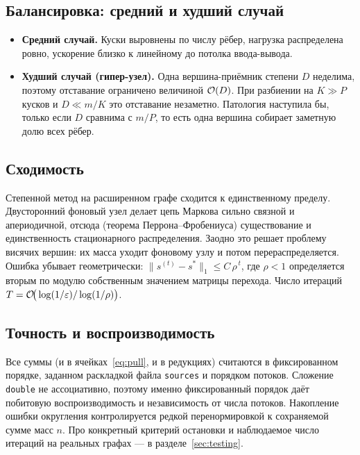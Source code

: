 \subsection{Балансировка: средний и худший случай}
\begin{itemize}[itemsep=2pt]
  \item \textbf{Средний случай.} Куски выровнены по числу рёбер, нагрузка распределена ровно,
        ускорение близко к линейному до потолка ввода-вывода.
  \item \textbf{Худший случай (гипер-узел).} Одна вершина-приёмник степени $D$ неделима, поэтому
        отставание ограничено величиной $\mathcal{O}(D)$. При разбиении на $K\gg P$ кусков и $D\ll m/K$ это
        отставание незаметно. Патология наступила бы, только если $D$ сравнима с $m/P$, то есть одна
        вершина собирает заметную долю всех рёбер.
\end{itemize}

\subsection{Сходимость}
Степенной метод на расширенном графе сходится к единственному пределу. Двусторонний фоновый узел
делает цепь Маркова сильно связной и апериодичной, отсюда (теорема Перрона--Фробениуса) существование
и единственность стационарного распределения. Заодно это решает проблему висячих вершин: их масса
уходит фоновому узлу и потом перераспределяется. Ошибка убывает геометрически:
$\|s^{(t)} - s^\ast\|_1 \le C\,\rho^{\,t}$, где $\rho<1$ определяется вторым по модулю собственным
значением матрицы перехода. Число итераций $T = \mathcal{O}\!\big(\log(1/\varepsilon)/\log(1/\rho)\big)$.

\subsection{Точность и воспроизводимость}
Все суммы (и в ячейках~\eqref{eq:pull}, и в редукциях) считаются в фиксированном порядке, заданном
раскладкой файла \texttt{sources} и порядком потоков. Сложение \texttt{double} не ассоциативно,
поэтому именно фиксированный порядок даёт побитовую воспроизводимость и независимость от числа
потоков. Накопление ошибки округления контролируется редкой перенормировкой к сохраняемой сумме масс
$n$. Про конкретный критерий остановки и наблюдаемое число итераций на реальных графах --- в
разделе~\ref{sec:testing}.
